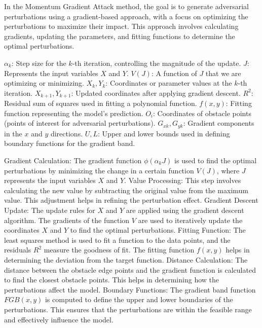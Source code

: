 In the Momentum Gradient Attack method, the goal is to generate adversarial perturbations using a gradient-based approach, with a focus on optimizing the perturbations to maximize their impact. This approach involves calculating gradients, updating the parameters, and fitting functions to determine the optimal perturbations.

$\alpha_k$: Step size for the $k$-th iteration, controlling the magnitude of the update.
$J$: Represents the input variables $X$ and $Y$.
$V(J)$: A function of $J$ that we are optimizing or minimizing.
$X_k, Y_k$: Coordinates or parameter values at the $k$-th iteration.
$X_{k+1}, Y_{k+1}$: Updated coordinates after applying gradient descent.
$R^2$: Residual sum of squares used in fitting a polynomial function.
$f(x, y)$: Fitting function representing the model's prediction.
$O_i$: Coordinates of obstacle points (points of interest for adversarial perturbations).
$G_{xk}, G_{yk}$: Gradient components in the $x$ and $y$ directions.
$U, L$: Upper and lower bounds used in defining boundary functions for the gradient band.


Gradient Calculation: The gradient function $\phi(\alpha_k J)$ is used to find the optimal perturbations by minimizing the change in a certain function $V(J)$, where $J$ represents the input variables $X$ and $Y$.
Value Processing: This step involves calculating the new value by subtracting the original value from the maximum value. This adjustment helps in refining the perturbation effect.
Gradient Descent Update: The update rules for $X$ and $Y$ are applied using the gradient descent algorithm. The gradients of the function $V$ are used to iteratively update the coordinates $X$ and $Y$ to find the optimal perturbations.
Fitting Function: The least squares method is used to fit a function to the data points, and the residuals $R^2$ measure the goodness of fit. The fitting function $f(x, y)$ helps in determining the deviation from the target function.
Distance Calculation: The distance between the obstacle edge points and the gradient function is calculated to find the closest obstacle points. This helps in determining how the perturbations affect the model.
Boundary Functions: The gradient band function $ FGB(x, y)$ is computed to define the upper and lower boundaries of the perturbations. This ensures that the perturbations are within the feasible range and effectively influence the model.


